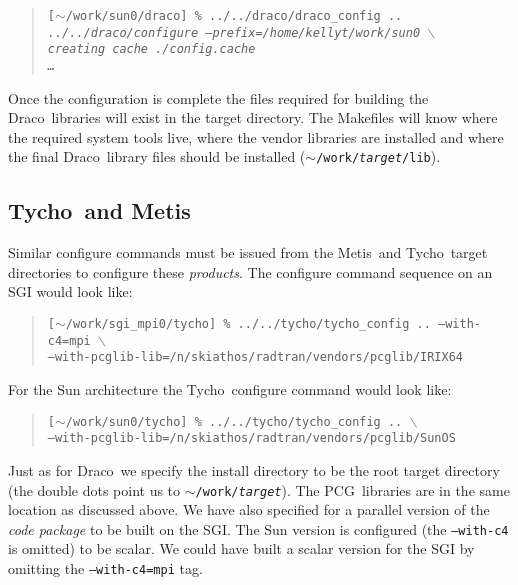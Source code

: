 \documentclass[10pt]{nmemo}
\newcommand{\comp}[1]{\normalfont\normalsize\texttt{#1}}
\newcommand{\draco}{{\normalfont\sffamily Draco}}
\newcommand{\tycho}{{\normalfont\sffamily Tycho}}
\newcommand{\metis}{{\normalfont\sffamily Metis}}
\newcommand{\pcg}{{\normalfont\sffamily PCG}}
\begin{document}
\footnotesize
\begin{verse}
\texttt{[$\sim$/work/sun0/draco] \% ../../draco/draco\_config .. \\
\emph{../../draco/configure --prefix=/home/kellyt/work/sun0 $\backslash$\\
\hspace{0.5in}creating cache ./config.cache\\
\hspace{1.0in} \ldots }}
\end{verse}
\normalsize

Once the configuration is complete the files required for building the 
\draco\ libraries will exist in the target directory.  The Makefiles
will know where the required system tools live, where the vendor
libraries are installed and where the final \draco\ library files
should be installed (\comp{$\sim$/work/\emph{target}/lib}).

\subsection{\tycho\ and \metis}

Similar configure commands must be issued from the \metis\ and \tycho\ 
target directories to configure these \emph{products}.  The configure
command sequence on an SGI would look like:

\footnotesize
\begin{verse}
\texttt{[$\sim$/work/sgi\_mpi0/tycho] \% ../../tycho/tycho\_config 
.. --with-c4=mpi $\backslash$\\
\hspace{0.5in}--with-pcglib-lib=/n/skiathos/radtran/vendors/pcglib/IRIX64}
\end{verse}
\normalsize

For the Sun architecture the \tycho\ configure command would look
like:

\footnotesize
\begin{verse}
\texttt{[$\sim$/work/sun0/tycho] \% ../../tycho/tycho\_config 
.. $\backslash$\\
\hspace{0.5in}--with-pcglib-lib=/n/skiathos/radtran/vendors/pcglib/SunOS}
\end{verse}
\normalsize

Just as for \draco\ we specify the install directory to be the root
target directory (the double dots point us to
\comp{$\sim$/work/\emph{target}}).  The \pcg\ libraries are in the
same location as discussed above.  We have also specified for a
parallel version of the \emph{code package} to be built on the SGI.
The Sun version is configured (the \comp{--with-c4} is omitted) to be
scalar.  We could have built a scalar version for the SGI by omitting
the \comp{--with-c4=mpi} tag.
\end{document}
